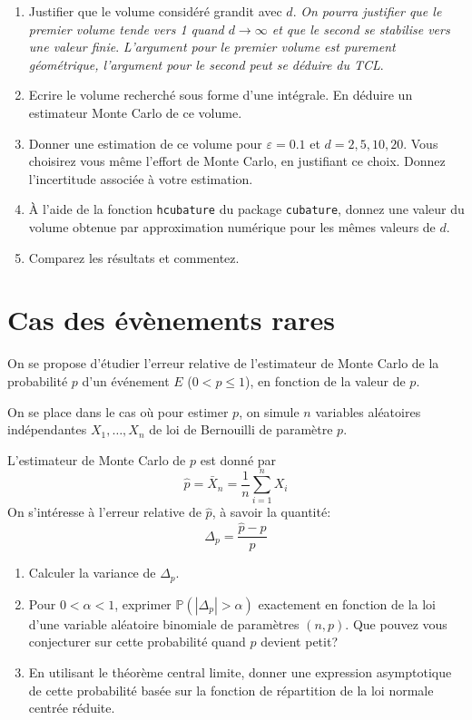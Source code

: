 \documentclass[]{article}
\providecommand{\tightlist}{%
  \setlength{\itemsep}{0pt}\setlength{\parskip}{0pt}}
\begin{document}
\begin{enumerate}
\def\labelenumi{\arabic{enumi}.}
\item
  Justifier que le volume considéré grandit avec \(d\). \emph{On pourra
  justifier que le premier volume tende vers 1 quand
  \(d\rightarrow \infty\) et que le second se stabilise vers une valeur
  finie}. \emph{L'argument pour le premier volume est purement
  géométrique, l'argument pour le second peut se déduire du TCL}.
\item
  Ecrire le volume recherché sous forme d'une intégrale. En déduire un
  estimateur Monte Carlo de ce volume.
\item
  Donner une estimation de ce volume pour \(\varepsilon = 0.1\) et
  \(d = 2, 5, 10, 20\). Vous choisirez vous même l'effort de Monte
  Carlo, en justifiant ce choix. Donnez l'incertitude associée à votre
  estimation.
\item
  À l'aide de la fonction \texttt{hcubature} du package
  \texttt{cubature}, donnez une valeur du volume obtenue par
  approximation numérique pour les mêmes valeurs de \(d\).
\item
  Comparez les résultats et commentez.
\end{enumerate}

\hypertarget{cas-des-uxe9vuxe8nements-rares}{%
\section{Cas des évènements
rares}\label{cas-des-uxe9vuxe8nements-rares}}

On se propose d'étudier l'erreur relative de l'estimateur de Monte Carlo
de la probabilité \(p\) d'un événement \(E\) (\(0 < p \leq 1\)), en
fonction de la valeur de \(p\).

On se place dans le cas où pour estimer \(p\), on simule \(n\) variables
aléatoires indépendantes \(X_1,\dots, X_n\) de loi de Bernouilli de
paramètre \(p\).

L'estimateur de Monte Carlo de \(p\) est donné par
\[\hat{p} = \bar{X}_n = \frac{1}{n}\sum_{i = 1}^n X_i\] On s'intéresse à
l'erreur relative de \(\hat{p}\), à savoir la quantité:
\[\Delta_p = \frac{\hat{p} - p}{p}\]

\begin{enumerate}
\def\labelenumi{\arabic{enumi}.}
\tightlist
\item
  Calculer la variance de \(\Delta_p\).
\item
  Pour \(0 < \alpha < 1\), exprimer \(\mathbb{P}(|\Delta_p| > \alpha)\)
  exactement en fonction de la loi d'une variable aléatoire binomiale de
  paramètres \((n, p)\). Que pouvez vous conjecturer sur cette
  probabilité quand \(p\) devient petit?
\item
  En utilisant le théorème central limite, donner une expression
  asymptotique de cette probabilité basée sur la fonction de répartition
  de la loi normale centrée réduite.
\end{enumerate}
\end{document}
